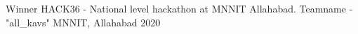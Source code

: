 

\begin{cvhonors}

  \cvhonor
    {Winner} %
    {HACK36 - National level hackathon at MNNIT Allahabad. Teamname - "all\_kavs"} %
    {MNNIT, Allahabad} %
    {2020} %
  



\end{cvhonors}
